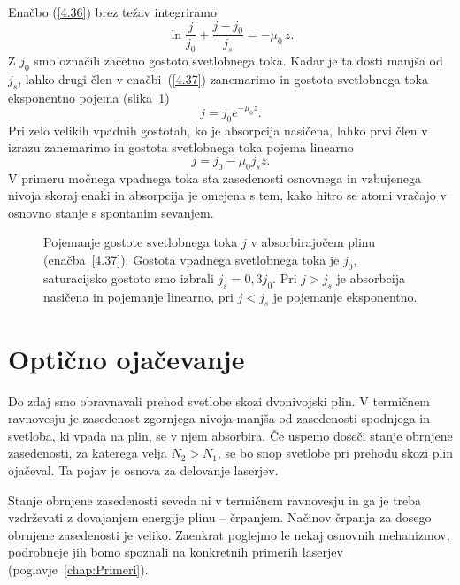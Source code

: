 Enačbo (\ref{4.36}) brez težav integriramo
\begin{equation}
\ln\frac{j}{j_{0}}+\frac{j-j_{0}}{j_{s}}=-\mu_{0}\, z.
\label{4.37}
\end{equation}
Z $j_{0}$ smo označili začetno gostoto svetlobnega toka. Kadar je ta dosti
manjša od $j_{s}$, lahko drugi člen v enačbi~(\ref{4.37}) zanemarimo in gostota svetlobnega
toka eksponentno pojema (slika~\ref{fig:abs2})
\begin{equation}
j = j_0 e^{-\mu_0 z}.
\end{equation}
Pri zelo velikih vpadnih gostotah, ko je absorpcija nasičena, lahko prvi člen v izrazu 
zanemarimo in gostota svetlobnega toka pojema linearno
\begin{equation}
j=j_{0}-\mu_{0}j_{s}z.
\label{4.38}
\end{equation}
V primeru močnega vpadnega toka sta zasedenosti osnovnega in vzbujenega nivoja skoraj
enaki in absorpcija je omejena s tem, kako hitro se atomi vračajo
v osnovno stanje s spontanim sevanjem. 

\begin{figure}[h]
\centering
\def\svgwidth{90truemm} 

\caption{Pojemanje gostote svetlobnega toka $j$ v absorbirajočem plinu (enačba~\ref{4.37}). 
Gostota vpadnega svetlobnega toka je $j_0$, saturacijsko
gostoto smo izbrali $j_s = 0,3 j_0$. Pri $j>j_s$ je absorbcija nasičena in pojemanje linearno, 
pri $j<j_s$ je pojemanje eksponentno.}
\label{fig:abs2}
\end{figure}

\section{Optično ojačevanje}
Do zdaj smo obravnavali prehod svetlobe skozi dvonivojski plin. V 
termičnem ravnovesju je zasedenost zgornjega nivoja manjša od zasedenosti spodnjega in 
svetloba, ki vpada na plin, se v njem absorbira. 
Če uspemo doseči stanje obrnjene zasedenosti,
za katerega velja $N_{2}>N_{1}$, se bo snop svetlobe pri prehodu skozi plin ojačeval. Ta pojav
je osnova za delovanje laserjev. 

Stanje obrnjene zasedenosti seveda ni v termičnem ravnovesju in ga je treba vzdrževati z dovajanjem 
energije plinu -- črpanjem.
Načinov črpanja za dosego obrnjene zasedenosti je veliko. Zaenkrat poglejmo
le nekaj osnovnih mehanizmov, podrobneje jih bomo spoznali na konkretnih primerih 
laserjev (poglavje~\ref{chap:Primeri}).

